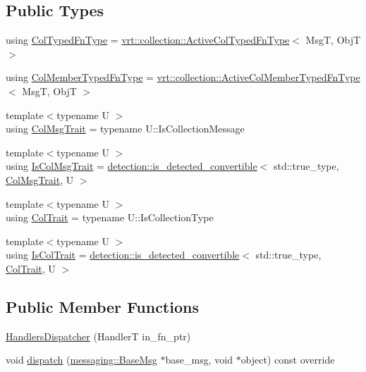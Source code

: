 \subsection*{Public Types}
\begin{DoxyCompactItemize}
\item 
using \hyperlink{structvt_1_1auto__registry_1_1_handlers_dispatcher_ad45c828eebdd2a18ffc0aa64f542a85c}{Col\+Typed\+Fn\+Type} = \hyperlink{namespacevt_1_1vrt_1_1collection_a939327f58a5838cf9d7dcc7f14d1670c}{vrt\+::collection\+::\+Active\+Col\+Typed\+Fn\+Type}$<$ MsgT, ObjT $>$
\item 
using \hyperlink{structvt_1_1auto__registry_1_1_handlers_dispatcher_a6f1a72ba3eec14527af044a478416b4d}{Col\+Member\+Typed\+Fn\+Type} = \hyperlink{namespacevt_1_1vrt_1_1collection_a87925616c03cf4ccc548d33b2fe172ee}{vrt\+::collection\+::\+Active\+Col\+Member\+Typed\+Fn\+Type}$<$ MsgT, ObjT $>$
\item 
{\footnotesize template$<$typename U $>$ }\\using \hyperlink{structvt_1_1auto__registry_1_1_handlers_dispatcher_aa2e8b80baa4dffdd9b2476ca9d2a7b46}{Col\+Msg\+Trait} = typename U\+::\+Is\+Collection\+Message
\item 
{\footnotesize template$<$typename U $>$ }\\using \hyperlink{structvt_1_1auto__registry_1_1_handlers_dispatcher_a585421b015b2d94915817c509e38b073}{Is\+Col\+Msg\+Trait} = \hyperlink{namespacedetection_afb970b23e39cfecb33449d40242c49ff}{detection\+::is\+\_\+detected\+\_\+convertible}$<$ std\+::true\+\_\+type, \hyperlink{structvt_1_1auto__registry_1_1_handlers_dispatcher_aa2e8b80baa4dffdd9b2476ca9d2a7b46}{Col\+Msg\+Trait}, U $>$
\item 
{\footnotesize template$<$typename U $>$ }\\using \hyperlink{structvt_1_1auto__registry_1_1_handlers_dispatcher_a0d707c7f0650f1185b5628aa71a98c87}{Col\+Trait} = typename U\+::\+Is\+Collection\+Type
\item 
{\footnotesize template$<$typename U $>$ }\\using \hyperlink{structvt_1_1auto__registry_1_1_handlers_dispatcher_aa5e51c30b4d5124a98d04bdc2be043ac}{Is\+Col\+Trait} = \hyperlink{namespacedetection_afb970b23e39cfecb33449d40242c49ff}{detection\+::is\+\_\+detected\+\_\+convertible}$<$ std\+::true\+\_\+type, \hyperlink{structvt_1_1auto__registry_1_1_handlers_dispatcher_a0d707c7f0650f1185b5628aa71a98c87}{Col\+Trait}, U $>$
\end{DoxyCompactItemize}
\subsection*{Public Member Functions}
\begin{DoxyCompactItemize}
\item 
\hyperlink{structvt_1_1auto__registry_1_1_handlers_dispatcher_aea820469903ae2c06a6e9934d3e8d0cc}{Handlers\+Dispatcher} (HandlerT in\+\_\+fn\+\_\+ptr)
\item 
void \hyperlink{structvt_1_1auto__registry_1_1_handlers_dispatcher_a3139ff15aaf26b383dad67114c785b95}{dispatch} (\hyperlink{structvt_1_1messaging_1_1_base_msg}{messaging\+::\+Base\+Msg} $\ast$base\+\_\+msg, void $\ast$object) const override
\end{DoxyCompactItemize}
